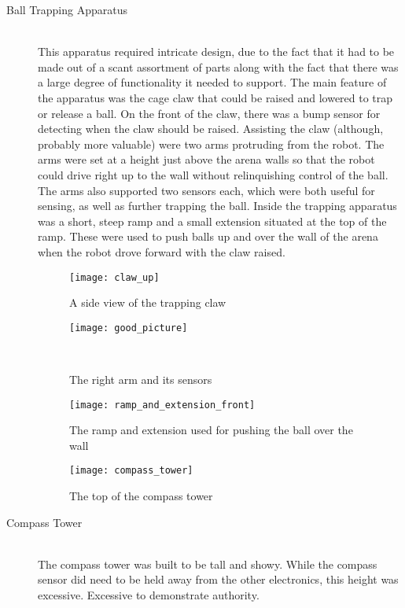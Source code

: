 \documentclass{article}
\begin{document}
\begin{description}
  \item[Ball Trapping Apparatus] \hfill \\
  This apparatus required intricate design, due to the fact that it had to be made out of a scant assortment of parts along with the fact that there was a large degree of functionality it needed to support. The main feature of the apparatus was the cage claw that could be raised and lowered to trap or release a ball. On the front of the claw, there was a bump sensor for detecting when the claw should be raised. Assisting the claw (although, probably more valuable) were two arms protruding from the robot. The arms were set at a height just above the arena walls so that the robot could drive right up to the wall without relinquishing control of the ball. The arms also supported two sensors each, which were both useful for sensing, as well as further trapping the ball. Inside the trapping apparatus was a short, steep ramp and a small extension situated at the top of the ramp. These were used to push balls up and over the wall of the arena when the robot drove forward with the claw raised.

  \begin{figure}[h!]
    \centering
    \begin{minipage}{.5\textwidth}
      \centering
      \texttt{[image: claw\_up]}
      \caption{A side view of the trapping claw}
      \label{fig:claw_side}
    \end{minipage}%
    \begin{minipage}{.5\textwidth}
      \centering
      \texttt{[image: good\_picture]}
      \caption{The right arm and its sensors}
      \label{fig:caster_ball_underneath}
    \end{minipage} \\
    \label{fig:ball_trapping_apparatus}
  \end{figure}

  \begin{figure}[h!]
    \centering
    \begin{minipage}{0.5\textwidth}
      \centering
      \texttt{[image: ramp\_and\_extension\_front]}
      \caption{The ramp and extension used for pushing the ball over the wall}
      \label{fig:claw_side}
    \end{minipage}%
    \begin{minipage}{0.5\textwidth}
      \centering
      \texttt{[image: compass\_tower]}
      \caption{The top of the compass tower}
      \label{fig:compass_tower}
    \end{minipage}
  \end{figure}

  \item[Compass Tower] \hfill \\
  The compass tower was built to be tall and showy. While the compass sensor did need to be held away from the other electronics, this height was excessive. Excessive to demonstrate authority.
\end{description}
\end{document}
